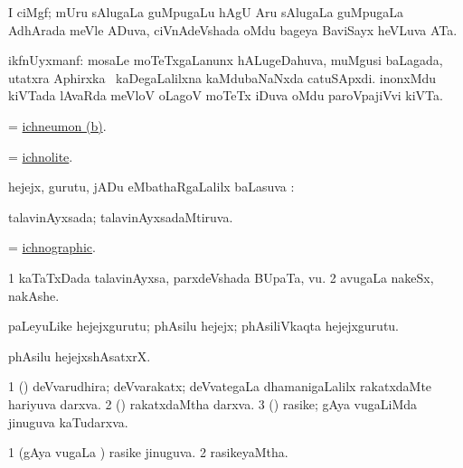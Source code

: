 \bentry
{}
\gl{\saMkiSx}
\bmng
{} 
\emng
\eentry

\bentry
{}
\gl{\nA}
\bmng
I ciMgf; mUru sAlugaLa  guMpugaLu hAgU Aru sAlugaLa  guMpugaLa AdhArada meVle ADuva, ciVnAdeVshada oMdu bageya BaviSayx heVLuva ATa. 
\emng
\eentry

\bentry
{}
\gl{\nA}
\bmng
ikfnUyxmanf: 
\banum
{} mosaLe moTeTxgaLanunx hALugeDahuva, muMgusi baLagada, utatxra Aphirxka \mo\ kaDegaLalilxna kaMdubaNaNxda catuSApxdi. 
\hypertarget{ichneumon(b)}{} 
 inonxMdu kiVTada lAvaRda meVloV oLagoV moTeTx iDuva oMdu paroVpajiVvi kiVTa. 
\eanum
\emng
\eentry

\bentry
{}
\gl{\nA}
\bmng
 = \hyperlink{ichneumon(b)}{ichneumon (b)}. 
\emng
\eentry

\bentry
{}
\gl{\nA}
\bmng
 = \hyperlink{ichnolite}{ichnolite}. 
\emng
\eentry

\bentry
{}
\gl{\sapUpa}
\bmng
hejejx, gurutu, jADu eMbathaRgaLalilx baLasuva \pUparx:  
\emng
\eentry

\bentry
{}
\gl{\gu}
\bmng
talavinAyxsada; talavinAyxsadaMtiruva. 
\emng
\eentry

\bentry
{}
\gl{\gu}
\bmng
 = \hyperlink{ichnographic}{ichnographic}. 
\emng
\eentry

\bentry
{}
\gl{\nA}
\bmng
\bnum
\num{1} kaTaTxDada talavinAyxsa, parxdeVshada BUpaTa, \mo vu. 
\num{2} avugaLa nakeSx, nakAshe. 
\enum
\emng
\eentry

\bentry
{}
\gl{\nA}
\bmng
paLeyuLike hejejxgurutu; phAsilu hejejx; phAsiliVkaqta hejejxgurutu. 
\emng
\eentry

\bentry
{}
\gl{\nA}
\bmng
phAsilu hejejxshAsatxrX. 
\emng
\eentry

\bentry
{}
\gl{\nA}
\bmng
\bnum
\num{1} (\girxVpu) deVvarudhira; deVvarakatx; deVvategaLa dhamanigaLalilx rakatxdaMte hariyuva darxva. 
\num{2} (\kAparx) rakatxdaMtha darxva. 
\num{3} (\roVshA) rasike; gAya \mo vugaLiMda jinuguva kaTudarxva. 
\enum
\emng
\eentry

\bentry
{}
\gl{\gu}
\bmng
\bnum
\num{1} (gAya \mo vugaLa \vi) rasike jinuguva. 
\num{2} rasikeyaMtha. 
\enum
\emng
\eentry

